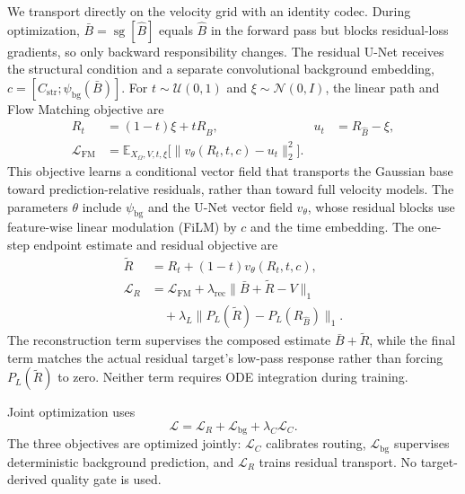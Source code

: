 \documentclass[letterpaper]{article}
\begin{document}
We transport directly on the velocity grid with an identity codec. During optimization, $\bar B=\operatorname{sg}[\hat B]$ equals $\hat B$ in the forward pass but blocks residual-loss gradients, so only backward responsibility changes. The residual U-Net receives the structural condition and a separate convolutional background embedding, $c=[C_{\mathrm{str}};\psi_{\mathrm{bg}}(\bar B)]$. For $t\sim\mathcal U(0,1)$ and $\xi\sim\mathcal N(0,I)$, the linear path and Flow Matching objective are
\begin{equation}
\begin{aligned}
R_t&=(1-t)\xi+tR_{\hat B},&
u_t&=R_{\hat B}-\xi,\\
\mathcal L_{\mathrm{FM}}
&=\mathbb E_{X_\Omega,V,t,\xi}
\bigl[\|v_\theta(R_t,t,c)-u_t\|_2^2\bigr].
\end{aligned}
\label{eq:fm-objective}
\end{equation}
This objective learns a conditional vector field that transports the Gaussian base toward prediction-relative residuals, rather than toward full velocity models.
The parameters $\theta$ include $\psi_{\mathrm{bg}}$ and the U-Net vector field $v_\theta$, whose residual blocks use feature-wise linear modulation (FiLM) \cite{perez2018film} by $c$ and the time embedding. The one-step endpoint estimate and residual objective are
\begin{equation}
\begin{aligned}
\widetilde R
&=R_t+(1-t)v_\theta(R_t,t,c),\\
\mathcal L_R
&=\mathcal L_{\mathrm{FM}}
+\lambda_{\mathrm{rec}}\|\bar B+\widetilde R-V\|_1\\
&\quad+\lambda_{L}\|P_L(\widetilde R)-P_L(R_{\hat B})\|_1.
\end{aligned}
\label{eq:residual-loss}
\end{equation}
The reconstruction term supervises the composed estimate $\bar B+\widetilde R$, while the final term matches the actual residual target's low-pass response rather than forcing $P_L(\widetilde R)$ to zero. Neither term requires ODE integration during training.

Joint optimization uses
\begin{equation}
\mathcal L=\mathcal L_R+\mathcal L_{\mathrm{bg}}+\lambda_C\mathcal L_C.
\label{eq:total-loss}
\end{equation}
The three objectives are optimized jointly: $\mathcal L_C$ calibrates routing, $\mathcal L_{\mathrm{bg}}$ supervises deterministic background prediction, and $\mathcal L_R$ trains residual transport. No target-derived quality gate is used.
\end{document}
